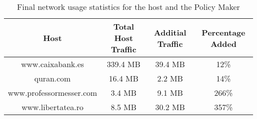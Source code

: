 \begin{table}[H]
\begin{center}
\begin{tabular}{| c c c c |}
	\hline
	Host & Total Host Traffic & Additial Traffic & Percentage Added \\ \hline
	www.caixabank.es        & 339.4 MB & 39.4 MB &  12\% \\ \hline
	quran.com               &  16.4 MB &  2.2 MB &  14\% \\ \hline
	www.professormesser.com &   3.4 MB &  9.1 MB & 266\% \\ \hline
	www.libertatea.ro       &   8.5 MB & 30.2 MB & 357\% \\ \hline
\end{tabular}
\end{center}
\label{tab:percentage}
	\caption{Final network usage statistics for the host and the Policy Maker}
\end{table}
%
%												
%
%
%
%
% 
% 
